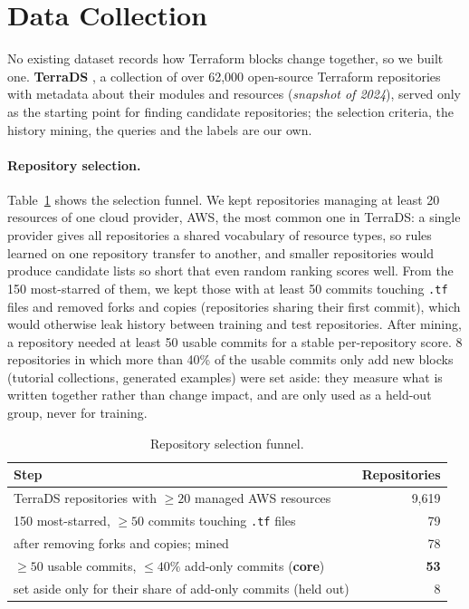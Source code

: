 \section{Data Collection}
\label{sec:data}

No existing dataset records how Terraform blocks change together, so we built one. \textbf{TerraDS}
\cite{buehler2025terrads}, a collection of over 62,000 open-source Terraform repositories with
metadata about their modules and resources (\textit{snapshot of 2024}), served only as the starting point
for finding candidate repositories; the selection criteria, the history mining, the queries and the
labels are our own.

\paragraph{Repository selection.} Table~\ref{tab:funnel} shows the selection funnel. We kept
repositories managing at least 20 resources of one cloud provider, AWS, the most common one in
TerraDS: a single provider gives all repositories a shared vocabulary of resource types, so rules
learned on one repository transfer to another, and smaller repositories would produce candidate
lists so short that even random ranking scores well. From the 150 most-starred of them, we kept
those with at least 50 commits touching \texttt{.tf} files and removed forks and copies (repositories
sharing their first commit), which would otherwise leak history between training and test
repositories. After mining, a repository needed at least 50 usable commits for a stable
per-repository score. 8 repositories in which more than 40\% of the usable commits only add new
blocks (tutorial collections, generated examples) were set aside: they measure what is written together rather than
change impact, and are only used as a held-out group, never for training.

\begin{table}[ht]
\begin{tabular}{@{}lr@{}}
\toprule
Step & Repositories \\
\midrule
TerraDS repositories with $\geq 20$ managed AWS resources & 9,619 \\
150 most-starred, $\geq 50$ commits touching \texttt{.tf} files & 79 \\
after removing forks and copies; mined & 78 \\
$\geq 50$ usable commits, $\leq 40\%$ add-only commits (\textbf{core}) & \textbf{53} \\
\quad set aside only for their share of add-only commits (held out) & 8 \\
\bottomrule
\end{tabular}
\centering
\small
\caption{Repository selection funnel.}
\label{tab:funnel}
\end{table}

